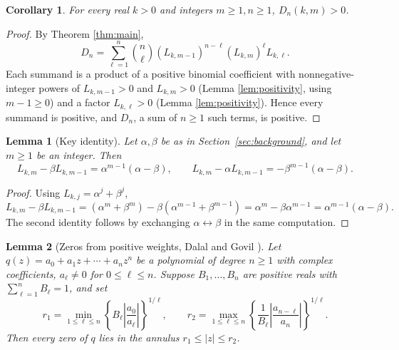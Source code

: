 \documentclass[11pt,a4paper]{article}
\newtheorem{lemma}{Lemma}[section]
\newtheorem{cor}{Corollary}[section]
\numberwithin{equation}{section}
\numberwithin{table}{section}
\numberwithin{figure}{section}
\begin{document}
\begin{cor}
	\label{cor:Dnpos}
	For every real $k>0$ and integers $m\ge1,n\ge1$, $D_n(k,m)>0$.
\end{cor}

\begin{proof}
	By Theorem \ref{thm:main},
	\[
	D_n=\sum_{\ell=1}^n\binom{n}{\ell}(L_{k,m-1})^{n-\ell}(L_{k,m})^{\ell}L_{k,\ell}.
	\]
	Each summand is a product of a positive binomial coefficient with nonnegative-integer powers of $L_{k,m-1}>0$ and $L_{k,m}>0$ (Lemma \ref{lem:positivity}, using $m-1\ge0$) and a factor $L_{k,\ell}>0$ (Lemma \ref{lem:positivity}). Hence every summand is positive, and $D_n$, a sum of $n\ge1$ such terms, is positive.
\end{proof}

\begin{lemma}[Key identity]
	\label{lem:key}
Let $\alpha,\beta$ be as in Section~\ref{sec:background}, and let $m\ge1$ be an integer. Then
	\[
	L_{k,m}-\beta L_{k,m-1}=\alpha^{m-1}(\alpha-\beta),
	\qquad
	L_{k,m}-\alpha L_{k,m-1}=-\beta^{m-1}(\alpha-\beta).
	\]
\end{lemma}

\begin{proof}
	Using $L_{k,j}=\alpha^j+\beta^j$,
	\[
	L_{k,m}-\beta L_{k,m-1}=(\alpha^m+\beta^m)-\beta(\alpha^{m-1}+\beta^{m-1})=\alpha^m-\beta\alpha^{m-1}=\alpha^{m-1}(\alpha-\beta).
	\]
	The second identity follows by exchanging $\alpha\leftrightarrow\beta$ in the same computation.
\end{proof}

\begin{lemma}[Zeros from positive weights, Dalal and Govil \cite{dalalgovil}]
	\label{lem:general}
	Let $q(z)=a_0+a_1z+\cdots+a_nz^n$ be a polynomial of degree $n\ge1$ with complex coefficients, $a_\ell\neq0$ for $0\le\ell\le n$. Suppose $B_1,\dots,B_n$ are positive reals with $\sum_{\ell=1}^nB_\ell=1$, and set
	\[
	r_1=\min_{1\le\ell\le n}\left\{B_\ell\left|\frac{a_0}{a_\ell}\right|\right\}^{1/\ell},
	\qquad
	r_2=\max_{1\le\ell\le n}\left\{\frac{1}{B_\ell}\left|\frac{a_{n-\ell}}{a_n}\right|\right\}^{1/\ell}.
	\]
	Then every zero of $q$ lies in the annulus $r_1\le|z|\le r_2$.
\end{lemma}
\end{document}

